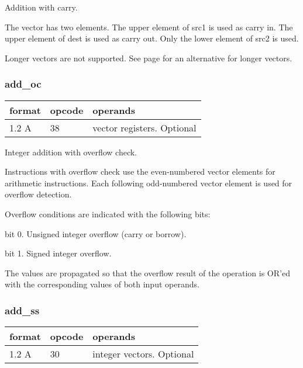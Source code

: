 \documentclass[forwardcom.tex]{subfiles}
\begin{document}
Addition with carry.
\vspace{2mm}

The vector has two elements. The upper element of src1 is used as carry in. The upper element of dest is used as carry out. Only the lower element of src2 is used.
\vspace{2mm}

Longer vectors are not supported. See page 
\pageref{highPrecisionArithmetic} for an alternative for longer vectors.

\subsubsection{add\_oc}
\label{table:addOcInstruction}
\begin{tabular}{|p{12mm}|p{12mm}|p{110mm}|}
\hline
\bfseries format & \bfseries opcode & \bfseries operands \\ \hline
1.2 A & 38 & vector registers. Optional \\ \hline
\end{tabular}
\vspace{2mm}

Integer addition with overflow check.
\vspace{2mm}

Instructions with overflow check use the even-numbered vector elements for arithmetic instructions. Each following odd-numbered vector element is used for overflow detection.
\vspace{2mm}

Overflow conditions are indicated with the following bits:
\vspace{2mm}

bit 0. Unsigned integer overflow (carry or borrow).

bit 1. Signed integer overflow.

\vspace{2mm}

The values are propagated so that the overflow result of the operation is OR'ed with the corresponding values of both input operands.
\vspace{2mm}

\subsubsection{add\_ss}
\label{table:addSsInstruction}
\begin{tabular}{|p{12mm}|p{12mm}|p{110mm}|}
\hline
\bfseries format & \bfseries opcode & \bfseries operands \\ \hline
1.2 A & 30 & integer vectors. Optional \\ \hline
\end{tabular}
\vspace{2mm}
\end{document}
